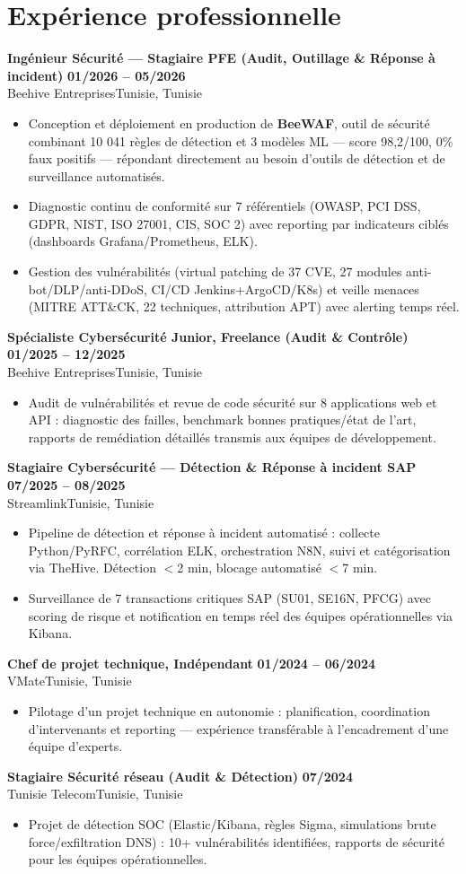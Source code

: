 \documentclass[a4paper,9pt]{article}
\newcommand{\cventry}[4]{\textbf{#1} \hfill \textbf{#4}\\[0.2pt]#2{\ifx\relax#3\relax\else, #3\fi}\par\vspace{0.3pt}}
\begin{document}
\section{Expérience professionnelle}
\cventry{Ingénieur Sécurité --- Stagiaire PFE (Audit, Outillage \& Réponse à incident)}{Beehive Entreprises}{Tunisie}{01/2026 -- 05/2026}
\begin{itemize}
  \item Conception et déploiement en production de \textbf{BeeWAF}, outil de sécurité combinant 10 041 règles de détection et 3 modèles ML --- score 98,2/100, 0\% faux positifs --- répondant directement au besoin d'outils de détection et de surveillance automatisés.
  \item Diagnostic continu de conformité sur 7 référentiels (OWASP, PCI DSS, GDPR, NIST, ISO 27001, CIS, SOC 2) avec reporting par indicateurs ciblés (dashboards Grafana/Prometheus, ELK).
  \item Gestion des vulnérabilités (virtual patching de 37 CVE, 27 modules anti-bot/DLP/anti-DDoS, CI/CD Jenkins+ArgoCD/K8s) et veille menaces (MITRE ATT\&CK, 22 techniques, attribution APT) avec alerting temps réel.
\end{itemize}
\cventry{Spécialiste Cybersécurité Junior, Freelance (Audit \& Contrôle)}{Beehive Entreprises}{Tunisie}{01/2025 -- 12/2025}
\begin{itemize}
  \item Audit de vulnérabilités et revue de code sécurité sur 8 applications web et API : diagnostic des failles, benchmark bonnes pratiques/état de l'art, rapports de remédiation détaillés transmis aux équipes de développement.
\end{itemize}
\cventry{Stagiaire Cybersécurité --- Détection \& Réponse à incident SAP}{Streamlink}{Tunisie}{07/2025 -- 08/2025}
\begin{itemize}
  \item Pipeline de détection et réponse à incident automatisé : collecte Python/PyRFC, corrélation ELK, orchestration N8N, suivi et catégorisation via TheHive. Détection $<$2 min, blocage automatisé $<$7 min.
  \item Surveillance de 7 transactions critiques SAP (SU01, SE16N, PFCG) avec scoring de risque et notification en temps réel des équipes opérationnelles via Kibana.
\end{itemize}
\cventry{Chef de projet technique, Indépendant}{VMate}{Tunisie}{01/2024 -- 06/2024}
\begin{itemize}
  \item Pilotage d'un projet technique en autonomie : planification, coordination d'intervenants et reporting --- expérience transférable à l'encadrement d'une équipe d'experts.
\end{itemize}
\cventry{Stagiaire Sécurité réseau (Audit \& Détection)}{Tunisie Telecom}{Tunisie}{07/2024}
\begin{itemize}
  \item Projet de détection SOC (Elastic/Kibana, règles Sigma, simulations brute force/exfiltration DNS) : 10+ vulnérabilités identifiées, rapports de sécurité pour les équipes opérationnelles.
\end{itemize}
\end{document}
